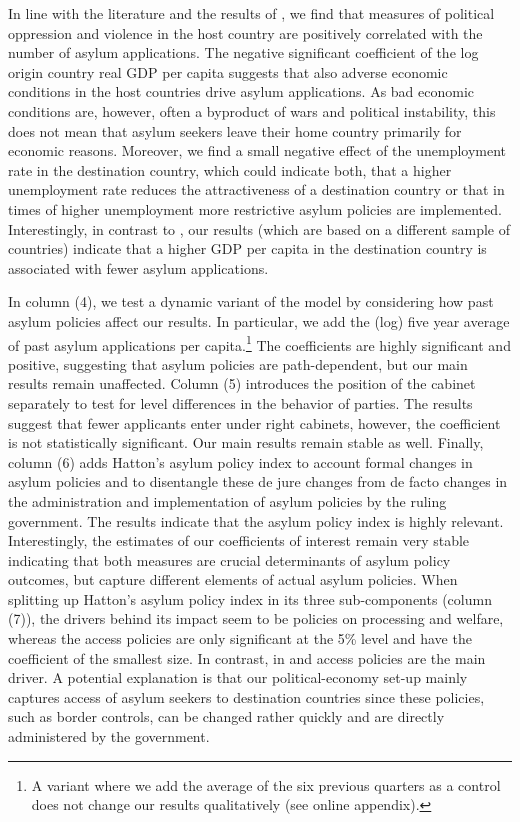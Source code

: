 \documentclass[a4paper,12pt]{article}
\begin{document}
In line with the literature and the results of \citet{hatton2016}, we find that measures of political oppression and violence in the host country are positively correlated with the number of asylum applications. The negative significant coefficient of the log origin country real GDP per capita suggests that also adverse economic conditions in the host countries drive asylum applications. As bad economic conditions are, however, often a byproduct of wars and political instability, this does not mean that asylum seekers leave their home country primarily for economic reasons. Moreover, we find a small negative effect of the unemployment rate in the destination country, which could indicate both, that a higher unemployment rate reduces the attractiveness of a destination country or that in times of higher unemployment more restrictive asylum policies are implemented. Interestingly, in contrast to \citet{hatton2016}, our results (which are based on a different sample of countries) indicate that a higher GDP per capita in the destination country is associated with fewer asylum applications. 

In column (4), we test a dynamic variant of the model by considering how past asylum policies affect our results. In particular, we add the (log) five year average of past asylum applications per capita.\footnote{A variant where we add the average of the six previous quarters as a control does not change our results qualitatively (see online appendix).} The coefficients are highly significant and positive, suggesting that asylum policies are path-dependent, but our main results remain unaffected. Column (5) introduces the position of the cabinet separately to test for level differences in the behavior of parties. The results suggest that fewer applicants enter under right cabinets, however, the coefficient is not statistically significant. Our main results remain stable as well. Finally, column (6) adds Hatton's asylum policy index to account formal changes in asylum policies and to disentangle these de jure changes from de facto changes in the administration and implementation of asylum policies by the ruling government. The results indicate that the asylum policy index is highly relevant. Interestingly, the estimates of our coefficients of interest remain very stable indicating that both measures are crucial determinants of asylum policy outcomes, but capture different elements of actual asylum policies. When splitting up Hatton's asylum policy index in its three sub-components (column (7)), the drivers behind its impact seem to be policies on processing and welfare, whereas the access policies are only significant at the 5\% level and have the coefficient of the smallest size. In contrast, in \citet{hatton2017} and \citet{hatton2016} access policies are the main driver. A potential explanation is that our political-economy set-up mainly captures access of asylum seekers to destination countries since these policies, such as border controls, can be changed rather quickly and are directly administered by the government. 
\end{document}
